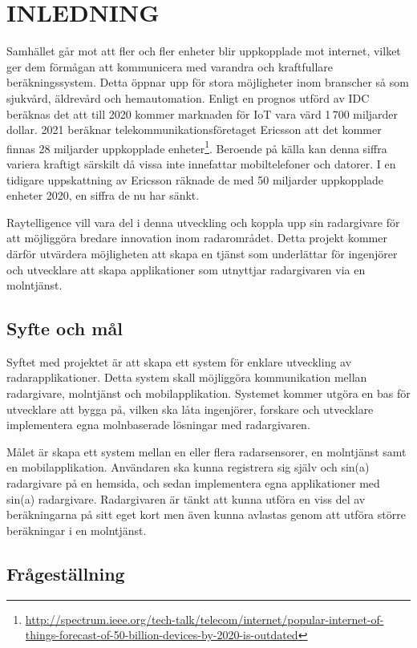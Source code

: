 \chapter{INLEDNING}
\thispagestyle{fancy}
Samhället går mot att fler och fler enheter blir uppkopplade mot internet, vilket ger dem förmågan att kommunicera med varandra och kraftfullare beräkningssystem. Detta öppnar upp för stora möjligheter inom branscher så som sjukvård, äldrevård och hemautomation. Enligt en prognos utförd av IDC beräknas det att till 2020 kommer marknaden för IoT vara värd 1\,700 miljarder dollar. 2021 beräknar telekommunikationsföretaget Ericsson att det kommer finnas 28 miljarder uppkopplade enheter\footnote{\url{http://spectrum.ieee.org/tech-talk/telecom/internet/popular-internet-of-things-forecast-of-50-billion-devices-by-2020-is-outdated}}. Beroende på källa kan denna siffra variera kraftigt särskilt då vissa inte innefattar mobiltelefoner och datorer. I en tidigare uppskattning av Ericsson räknade de med 50 miljarder uppkopplade enheter 2020, en siffra de nu har sänkt.

Raytelligence vill vara del i denna utveckling och koppla upp sin radargivare för att möjliggöra bredare innovation inom radarområdet. Detta projekt kommer därför utvärdera möjligheten att skapa en tjänst som underlättar för ingenjörer och utvecklare att skapa applikationer som utnyttjar radargivaren via en molntjänst.

\section{Syfte och mål}
Syftet med projektet är att skapa ett system för enklare utveckling av radarapplikationer. Detta system skall möjliggöra kommunikation mellan radargivare, molntjänst och mobilapplikation. Systemet kommer utgöra en bas för utvecklare att bygga på, vilken ska låta ingenjörer, forskare och utvecklare implementera egna molnbaserade lösningar med radargivaren. 

Målet är skapa ett system mellan en eller flera radarsensorer, en molntjänst samt en mobilapplikation. Användaren ska kunna registrera sig själv och sin(a) radargivare på en hemsida, och sedan implementera egna applikationer med sin(a) radargivare. Radargivaren är tänkt att kunna utföra en viss del av beräkningarna på sitt eget kort men även kunna avlastas genom att utföra större beräkningar i en molntjänst.

\section{Frågeställning}
\vspace{3mm}

